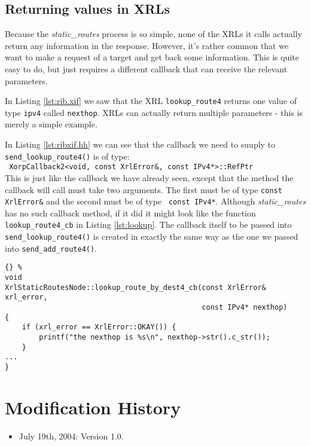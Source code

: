 \documentclass[11pt]{article}
\newcommand{\stt}{\tt\small}
\newcommand{\SRI}{{\it static\_routes}\xspace}
\begin{document}
\subsection{Returning values in XRLs}

Because the \SRI process is so simple, none of the XRLs it calls
actually return any information in the response.  However, it's rather
common that we want to make a request of a target and get back some
information.  This is quite easy to do, but just requires a different
callback that can receive the relevant parameters.

In Listing \ref{lst:rib.xif} we saw that the XRL {\stt lookup\_route4}
returns one value of type {\stt ipv4} called {\stt nexthop}.  XRLs can
actually return multiple parameters - this is merely a simple
example.

In Listing \ref{lst:ribxif.hh} we can see that the callback we need to
suuply to {\stt send\_lookup\_route4()} is of type:\\ {\stt
XorpCallback2<void, const XrlError\&, const IPv4*>::RefPtr}\\ This is
just like the callback we have already seen, except that the method
the callback will call must take two arguments.  The first must be of
type {\stt const XrlError\&} and the second must be of type {\stt
const IPv4*}.  Although \SRI has no such callback method, if it did it
might look like the function {\stt lookup\_route4\_cb} in Listing
\ref{lst:lookup}.  The callback itself to be passed into {\stt
send\_lookup\_route4()} is created in exactly the same way as the one
we passed into {\stt send\_add\_route4()}.

\begin{lstlisting}[caption={Hypothetical callback for  {\stt
	send\_lookup\_route4()} \label{lst:lookup} }]{} %
void
XrlStaticRoutesNode::lookup_route_by_dest4_cb(const XrlError& xrl_error,
                                              const IPv4* nexthop)
{
    if (xrl_error == XrlError::OKAY()) {
        printf("the nexthop is %s\n", nexthop->str().c_str());
    }
...
}
\end{lstlisting}
\newpage
\appendix
\section{Modification History}

\begin{itemize}

  \item July 19th, 2004: Version 1.0.

\end{itemize}




\end{document}
